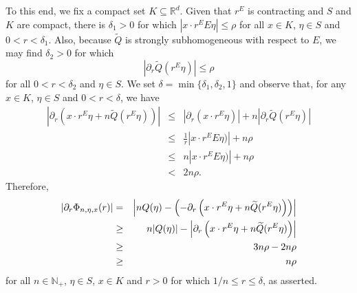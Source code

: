 \documentclass[smallextended]{svjour3}
\theoremstyle{remark}
\renewenvironment{proof}[1][\proofname]{\renewcommand\xproofname{#1}\xproof}{\endxproof}
\begin{document}
\begin{proof}
To this end, we fix a compact set $K\subseteq\mathbb{R}^d$. Given that $r^E$ is contracting and $S$ and $K$ are compact, there is $\delta_1>0$ for which $|x\cdot r^E E\eta|\leq \rho$ for all $x\in K$, $\eta\in S$ and $0<r<\delta_1$. Also, because $\widetilde{Q}$ is strongly subhomogeneous with respect to $E$, we may find $\delta_2>0$ for which
\begin{equation*}
    |\partial_r\widetilde{Q}(r^E\eta)|\leq \rho
\end{equation*}
for all $0<r<\delta_2$ and $\eta\in S$. We set $\delta=\min\{\delta_1,\delta_2,1\}$ and observe that, for any $x\in K$, $\eta\in S$ and $0<r<\delta$, we have
\begin{eqnarray*}
\left|\partial_r
\left(x\cdot r^E\eta
+n\widetilde{Q}
(r^E\eta)\right)
\right|
&\leq &
\left|\partial_r\left(x\cdot r^E\eta\right)\right|+n\left|
\partial_r\widetilde{Q}(r^E\eta)
\right|\\
&\leq&\frac{1}{r}|x\cdot r^E E\eta)|+n\rho\\
&\leq& n|x\cdot r^E E\eta)|+n\rho\\
&<&2n\rho.
\end{eqnarray*}
Therefore,
\begin{eqnarray*}
\abs{\partial_r\Phi_{n,\eta,x}(r)}&=&\abs{nQ(\eta)- \left(-\partial_r\left(x\cdot r^E\eta+n\widetilde{Q}(r^E\eta)\right)\right)}\\
&\geq& n|Q(\eta)|-\left|\partial_r
\left(x\cdot r^E\eta
+n\widetilde{Q}
(r^E\eta)\right)
\right|\\
&\geq& 3n\rho-2n\rho\\
&\geq &n\rho
\end{eqnarray*}
for all $n\in\mathbb{N}_+$, $\eta\in S$, $x\in K$ and $r>0$ for which $1/n\leq r\leq \delta$, as asserted.
\end{proof}
\end{document}
